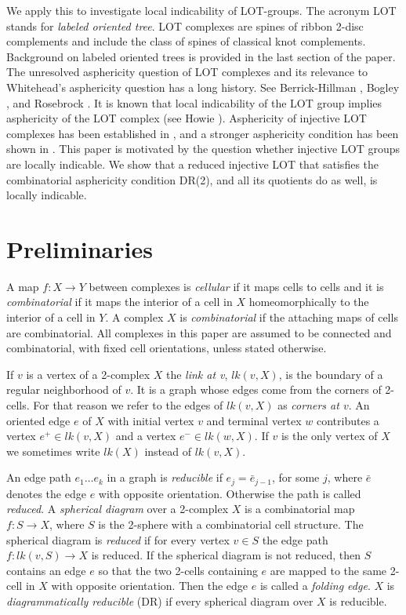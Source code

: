 \documentclass[12pt]{amsart}
\theoremstyle{definition}
\begin{document}
We apply this to investigate local indicability of LOT-groups. The acronym LOT stands for {\em labeled oriented tree}. LOT complexes are spines of ribbon 2-disc complements and include the class of spines of classical knot complements. Background on labeled oriented trees is provided in the last section of the paper. The unresolved asphericity question of LOT complexes and its relevance to Whitehead's asphericity question has a long history. See Berrick-Hillman \cite{BerrickHillman}, Bogley \cite{Bogley}, and Rosebrock \cite{Ro18}. It is known that local indicability of the LOT group implies asphericity of the LOT complex (see Howie \cite{Howie}). Asphericity of injective LOT complexes has been established in \cite{HarRose2017}, and a stronger asphericity condition has been shown in \cite{HarRose2020}. This paper is motivated by the question whether injective LOT groups are locally indicable. We show that a reduced injective LOT that satisfies the combinatorial asphericity condition DR(2), and all its quotients do as well, is locally indicable.


\section{Preliminaries}

A map $f\colon X\to Y$ between complexes is {\em cellular} if it maps cells to cells
and it is {\em combinatorial} if it maps the interior of a cell in $X$ homeomorphically to the interior of a cell in $Y$. A complex $X$ is {\em combinatorial} if the attaching maps of cells are combinatorial. All complexes in this paper are assumed to be connected and combinatorial, with fixed cell orientations, unless stated otherwise. 

If $v$ is a vertex of a 2-complex $X$ the {\em link at v}, $lk(v,X)$, is the boundary of a regular neighborhood of $v$. It is a graph whose edges come from the corners of 2-cells. For that reason we refer to the edges of $lk(v,X)$ as {\em corners at $v$}. An oriented edge $e$ of $X$ with initial vertex $v$ and terminal vertex $w$ contributes a vertex $e^+\in lk(v,X)$ and a vertex $e^-\in lk(w,X)$.
If $v$ is the only vertex of $X$ we sometimes write $lk(X)$ instead of $lk(v,X)$.

An edge path $e_1\dots e_k$ in a graph is {\em reducible} if $e_j=\bar e_{j-1}$, for some $j$, where $\bar e$ denotes the edge $e$ with opposite orientation. Otherwise the path is called {\em reduced}. A {\em spherical diagram} over a 2-complex $X$ is a combinatorial map $f\colon S\to X$, where $S$ is the 2-sphere with a combinatorial cell structure. The spherical diagram is {\em reduced} if for every vertex $v\in S$ the edge path $f\colon lk(v,S)\to X$ is reduced. If the spherical diagram is not reduced, then $S$ contains an edge $e$ so that the two 2-cells containing $e$ are mapped to the same 2-cell in $X$ with opposite orientation. Then the edge $e$ is called a {\em folding edge}. $X$ is {\em diagrammatically reducible} (DR) if every spherical diagram over $X$ is reducible.
\end{document}
